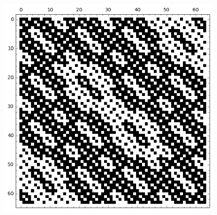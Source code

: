 \documentclass[pdf,sprung,slideColor,nocolorBG]{beamer}
\begin{document}
\begin{frame}
\begin{figure}
\begin{minipage}{.48\textwidth}
  \includegraphics[width=.9\linewidth]{../matrix_plot/c6_1_bent_cayley_graph_index_matrix.png}
  \label{fig:6_1_bent_cayley_graph_index_matrix}
\end{minipage}
\end{figure}
\end{frame}
% 
% 
% 
\end{document}
